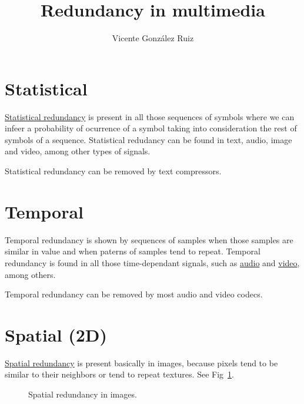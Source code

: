 
\title{Redundancy in multimedia}
\author{Vicente González Ruiz}
\maketitle

\section{Statistical}
\href{https://en.wikipedia.org/wiki/Redundancy_(information_theory)}{Statistical
  redundancy} is present in all those sequences of symbols where we
can infeer a probability of ocurrence of a symbol taking into
consideration the rest of symbols of a sequence. Statistical redudancy
can be found in text, audio, image and video, among other types of
signals.

Statistical redundancy can be removed by text compressors.

\section{Temporal}
Temporal redundancy is shown by sequences of samples when those
samples are similar in value and when paterns of samples tend to
repeat. Temporal redundancy is found in all those time-dependant
signals, such as
\href{https://en.wikipedia.org/wiki/Inter_frame}{audio} and
\href{https://en.wikipedia.org/wiki/Inter_frame}{video}, among others.

Temporal redundancy can be removed by most audio and video codecs.

\section{Spatial (2D)}
\href{https://robbfoxx.wordpress.com/2015/07/12/discussion-6-2-1-what-is-redundancy-temporal-redundancy-and-spatial-redundancy/}{Spatial
  redundancy} is present basically in images, because pixels tend to
be similar to their neighbors or tend to repeat textures. See
Fig~\ref{fig:correlacion_lena}.

\begin{figure}
  \caption{Spatial redundancy in images.}
  \label{fig:correlacion_lena}
\end{figure}

%
